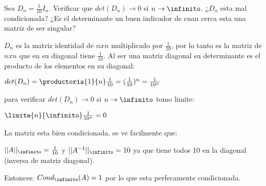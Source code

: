 \begin{enunciado}{\ejercicio}
Sea $D_n = \frac{1}{10} I_n.$  Verificar que $det(D_n) \rightarrow 0$ si $n \rightarrow \infinito$. ¿$D_n$ esta mal
condicionada? ¿Es el determinante un buen indicador de cuan cerca esta una matriz de ser
singular?
\end{enunciado}

\medskip

$D_n$ es la matriz identidad de $nxn$ multiplicado por $\frac{1}{10}$, por lo tanto es la matriz de $nxn$ 
que en su diagonal tiene $\frac{1}{10}$. Al ser una matriz diagonal su determinante es el producto de los elementos en su diagonal:

$
det(D_n) = 
\productoria{1}{n} \frac{1}{10} = 
(\frac{1}{10})^{n}=
\frac{1}{10^n}
$

para verificar $det(D_n) \rightarrow 0$ si $n \rightarrow \infinito$ tomo limite:

$\limite{n}{\infinito}\frac{1}{10^n} = 0$

La matriz esta bien condicionada, se ve facilmente que:

$||A||_\infinito = \frac{1}{10}$ y $||A^{-1}||_\infinito = 10$ ya que tiene todos 10 en la diagonal (inversa de matriz diagonal).

Entonces: $Cond_\infinito(A) = 1$ por lo que esta perfecamente condicionada.

\begin{aportes}
    \item {}
\end{aportes}